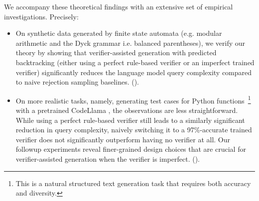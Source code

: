 We accompany these theoretical findings with an extensive set of empirical investigations. 
Precisely:  
\begin{itemize}%
\item On synthetic data generated by finite state automata (e.g. modular arithmetic and the Dyck grammar i.e. balanced parentheses),
we verify our theory by showing that verifier-assisted generation with predicted backtracking (either using a perfect rule-based verifier or an imperfect trained verifier) significantly reduces the language model query complexity compared to naive rejection sampling baselines.
().
\item On more realistic tasks, namely, generating test cases for Python functions~\footnote{
This is a natural structured text generation task that requires both accuracy and diversity.
} 
with a pretrained CodeLlama \citep{roziere2023code}, 
the observations are less straightforward.
While using a perfect rule-based verifier still leads to a similarly significant reduction in query complexity,
naively switching it to a 97\%-accurate trained verifier does not significantly outperform having no verifier at all.
Our followup experiments reveal finer-grained design choices that are crucial for verifier-assisted generation when the verifier is imperfect.
().
\end{itemize} 
\fi 

